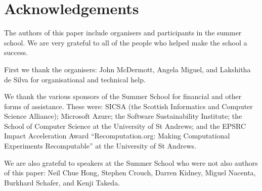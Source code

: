 \section*{Acknowledgements}
\label{s:ack}

The authors of this paper include organisers and participants in the
summer school. We are very grateful to all of the people who helped
make the school a success.

First we thank the organisers: John McDermott, Angela Miguel, and Lakshitha de Silva for organisational and technical help.

We thank the various sponsors of the Summer School  for financial and other forms of assistance.
These were: SICSA (the Scottish Informatics and Computer Science Alliance); 
Microsoft Azure; the Software Sustainability Institute; 
the School of Computer Science at the University of St Andrews; 
and the EPSRC Impact Acceleration Award ``Recomputation.org: Making
Computational Experiments Recomputable''
at the University of St Andrews.

We are also grateful to speakers at the Summer School who were not also authors of this paper: 
Neil Chue Hong,
Stephen Crouch, 
Darren Kidney, 
Miguel Nacenta,
Burkhard Schafer, and
Kenji Takeda.
